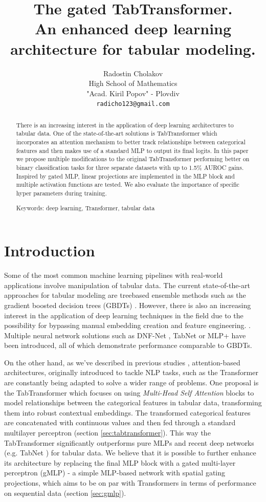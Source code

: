 \documentclass{article}
\title[The gated TabTransformer]{The gated TabTransformer.\\
An enhanced deep learning\\
architecture for tabular modeling.}
\author[R. Cholakov]{%
Radostin Cholakov\\%
High School of Mathematics\\%
"Acad. Kiril Popov" - Plovdiv\\%
\texttt{radicho123@gmail.com}%
}
\begin{document}
\maketitle
\begin{abstract}
    There is an increasing interest in the application of deep learning architectures to tabular data. One of the state-of-the-art solutions is TabTransformer which incorporates an attention mechanism to better track relationships between categorical features and then makes use of a standard MLP to output its final logits. In this paper we propose multiple modifications to the original TabTransformer performing better on binary classification tasks for three separate datasets with up to 1.5\% AUROC gains. Inspired by gated MLP, linear projections are implemented in the MLP block and multiple activation functions are tested. We also evaluate the importance of specific hyper parameters during training.

    \medskip
    Keywords: deep learning, Transformer, tabular data
\end{abstract}

\section{Introduction}

Some of the most common machine learning pipelines with real-world applications involve manipulation of tabular data. The current state-of-the-art approaches for tabular modeling are treebased ensemble methods such as the gradient boosted decision trees (GBDTs) \cite{chen2016xgboost}. However, there is also an increasing interest in the application of deep learning techniques in the field due to the possibility for bypassing manual embedding creation and feature engineering. \cite{fiedler2021simple}. Multiple neural network solutions such as DNF-Net \cite{abutbul2020dnf}, TabNet \cite{arik1908tabnet} or MLP+ \cite{fiedler2021simple} have been introduced, all of which demonstrate performance comparable to GBDTs.

On the other hand, as we've described in previous studies \cite{cholakov2021transformers}, attention-based architectures, originally introduced to tackle NLP tasks, such as the Transformer \cite{vaswani2017attention} are constantly being adapted to solve a wider range of problems. One proposal is the TabTransformer \cite{Huang2020TabTransformerTD} which focuses on using \textit{Multi-Head Self Attention} blocks to model relationships between the categorical features in tabular data, transforming them into robust contextual embeddings. The transformed categorical features are concatenated with continuous values and then fed through a standard multilayer perceptron \cite{haykin1994neural} (section \ref{sec:tabtransformer}). This way the TabTransformer significantly outperforms pure MLPs and recent deep networks (e.g. TabNet \cite{arik1908tabnet}) for tabular data. We believe that it is possible to further enhance its architecture by replacing the final MLP block with a gated multi-layer perceptron (gMLP) \cite{Liu2021PayAT} - a simple MLP-based network with spatial gating projections, which aims to be on par with Transformers in terms of performance on sequential data (section \ref{sec:gmlp}).
\end{document}
